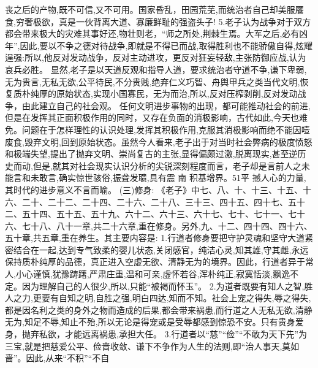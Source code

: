 \documentclass[a4paper,12pt,UTF8,twoside]{ctexbook}
\begin{document}
丧之后的产物,既不可信,又不可用。国家昏乱，田园荒芜,而统治者自己却美服餍食,穷奢极欲，真是一伙背离大道、寡廉鲜耻的强盗头子!
5.老子认为战争对于双方都会带来极大的灾难其事好还,物壮则老，“师之所处,荆棘生焉。大军之后,必有凶年”,因此,要以不争之德对待战争,即就是不得已而战,取得胜利也不能骄傲自得,炫耀逞强:所以,他反对发动战争，反对主动进攻，更反对狂妄轻敌,主张防御应战,认为哀兵必胜。
显然,老子是以天道反观和指导人道，要求统治者守道不争,谦下卑弱,无为贵言,无私无欲,公平待民,不分贵贱,绝弃仁义巧智、舟舆甲兵之类当代文明,恢复质朴纯厚的原始状态,实现小国寡民，无为而治,所以,反对压榨剥削,反对发动战争，由此建立自己的社会观。
任何文明进步事物的出现，都可能推动社会的前进,但是在发挥其正面积极作用的同时，又存在负面的消极影响，古代如此,今天也难免。问题在于怎样理性的认识处理,发挥其积极作用,克服其消极影响而绝不能因噎废食,毁弃文明,回到原始状态。虽然今人看来,老子出于对当时社会弊病的极度愤怒和极端失望,提出了抛弃文明、崇尚复古的主张,显得偏颇过激,脱离现实,甚至逆历史而动,但是,就其对社会现实认识分析的尖锐深刻程度而言，老子却是言前人之未能言和未敢言,确实惊世骇俗,振聋发聩,具有震
南
积基增界。51平
撼人心的力量,其时代的进步意义不言而喻。
(三)修身:
《老子》中七、八、十、十三、十五、十六、二十、二十二、二十四、二十六、二十八、三十三、四十五、四十七、五十二、五十四、五十五、五十九、六十二、六十三、六十七、七十、七十一、七十六、七十八、八十一章,共二十六章,重在修身。另外,九、十二、四十四、四十六、五十章,共五章,重在养生。其主要内容是:
1.行道者修身要把守护灵魂和坚守大道紧密结合在一起,达到专气致柔的婴儿状态,关闭感官，纯洁心灵,知其雄,守其雌,永远保持质朴纯厚的品德，真正进入空虚无欲、清静无为的境界。因此，行道者异于常人,小心谨慎,犹豫踌躇,严肃庄重,温和可亲,虚怀若谷,浑朴纯正,寂寞恬淡,飘逸不定。因为理解自己的人很少,所以,只能“被褐而怀玉”。
2.为道者既要有知人之智,胜人之力,更要有自知之明,自胜之强,明白四达,知而不知。社会上宠之得失,辱之得失,都是因名利之类的身外之物而造成的后果,都会带来祸患,而行道之人无私无欲,清静无为,知足不辱,知止不殆,所以无论是得宠或是受辱都感到惊恐不安。只有贵身爱身，抛弃私欲，才能远离祸患,承担大任。
3.行道者以“慈”“俭”“不敢为天下先”为三宝,就是把慈爱公平、俭啬收敛、谦下不争作为人生的法则,即“治人事天,莫如啬”。因此,从来“不积”“不自
\end{document}
